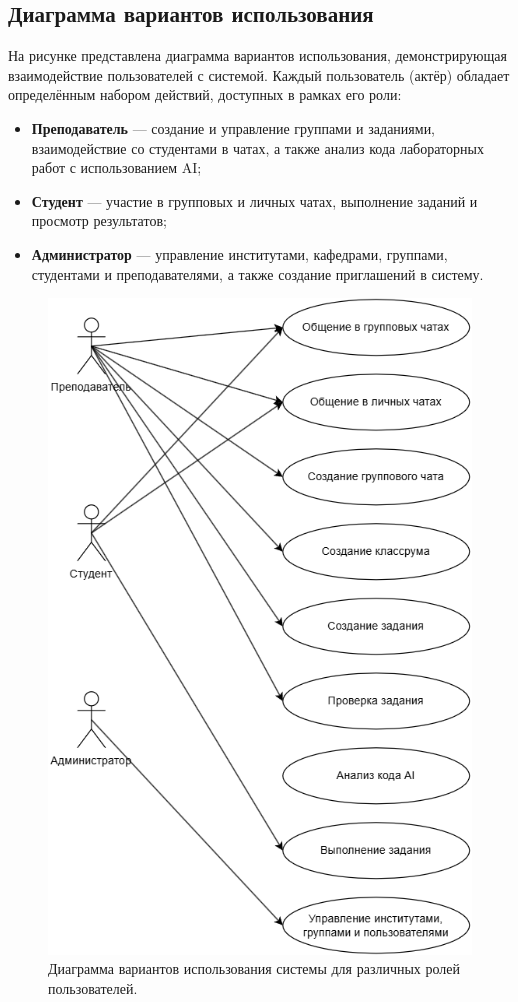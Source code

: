 \subsection{Диаграмма вариантов использования}

На рисунке представлена диаграмма вариантов использования, демонстрирующая взаимодействие пользователей с системой. Каждый пользователь (актёр) обладает определённым набором действий, доступных в рамках его роли:

\begin{itemize}
    \item \textbf{Преподаватель} — создание и управление группами и заданиями, взаимодействие со студентами в чатах, а также анализ кода лабораторных работ с использованием AI;
    \item \textbf{Студент} — участие в групповых и личных чатах, выполнение заданий и просмотр результатов;
    \item \textbf{Администратор} — управление институтами, кафедрами, группами, студентами и преподавателями, а также создание приглашений в систему.
\end{itemize}

\begin{figure}[H]
\centering
\includegraphics[width=0.5\linewidth]{static/useCaseDiagramm}
\caption{Диаграмма вариантов использования системы для различных ролей пользователей.}
\label{fig:usecasediagramm}
\end{figure}